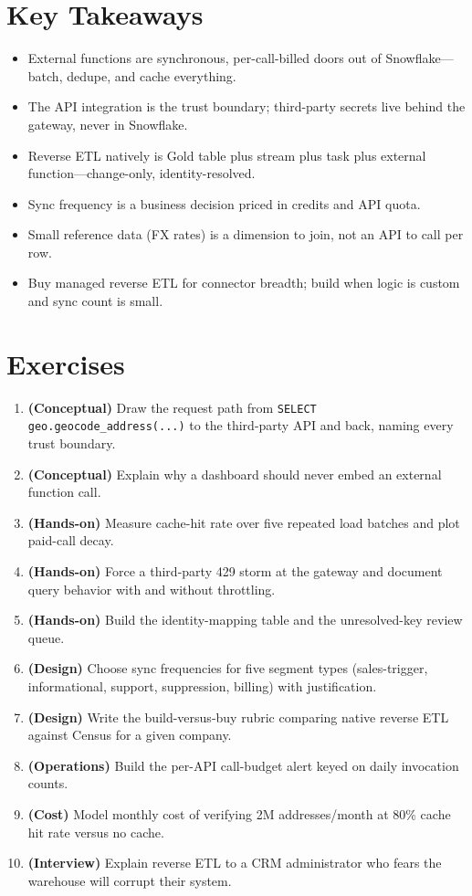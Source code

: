 \section*{Key Takeaways}
\begin{itemize}
    \item External functions are synchronous, per-call-billed doors out of Snowflake---batch, dedupe, and cache everything.
    \item The API integration is the trust boundary; third-party secrets live behind the gateway, never in Snowflake.
    \item Reverse ETL natively is Gold table plus stream plus task plus external function---change-only, identity-resolved.
    \item Sync frequency is a business decision priced in credits and API quota.
    \item Small reference data (FX rates) is a dimension to join, not an API to call per row.
    \item Buy managed reverse ETL for connector breadth; build when logic is custom and sync count is small.
\end{itemize}

\section{Exercises}
\begin{enumerate}
    \item \textbf{(Conceptual)} Draw the request path from \texttt{SELECT geo.geocode\_address(...)} to the third-party API and back, naming every trust boundary.
    \item \textbf{(Conceptual)} Explain why a dashboard should never embed an external function call.
    \item \textbf{(Hands-on)} Measure cache-hit rate over five repeated load batches and plot paid-call decay.
    \item \textbf{(Hands-on)} Force a third-party 429 storm at the gateway and document query behavior with and without throttling.
    \item \textbf{(Hands-on)} Build the identity-mapping table and the unresolved-key review queue.
    \item \textbf{(Design)} Choose sync frequencies for five segment types (sales-trigger, informational, support, suppression, billing) with justification.
    \item \textbf{(Design)} Write the build-versus-buy rubric comparing native reverse ETL against Census for a given company.
    \item \textbf{(Operations)} Build the per-API call-budget alert keyed on daily invocation counts.
    \item \textbf{(Cost)} Model monthly cost of verifying 2M addresses/month at 80\% cache hit rate versus no cache.
    \item \textbf{(Interview)} Explain reverse ETL to a CRM administrator who fears the warehouse will corrupt their system.
\end{enumerate}

